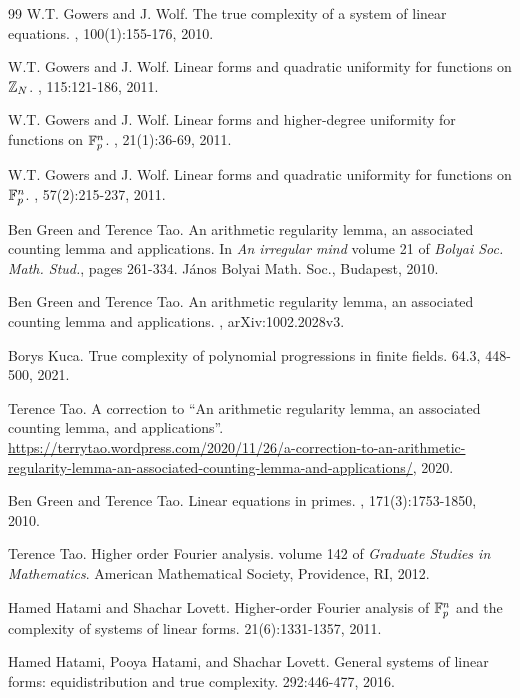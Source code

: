 \begin{thebibliography}{99}
W.T. Gowers and J. Wolf.
\newblock The true complexity of a system of linear equations.
, 100(1):155-176, 2010.
	
W.T. Gowers and J. Wolf.
\newblock Linear forms and quadratic uniformity for functions on {$\Bbb Z_N$}.
, 115:121-186, 2011.

W.T. Gowers and J. Wolf.
\newblock Linear forms and higher-degree uniformity for functions on {$\Bbb F^n_p$}.
, 21(1):36-69, 2011.	


W.T. Gowers and J. Wolf.
\newblock Linear forms and quadratic uniformity for functions on {$\Bbb F^n_p$}.
, 57(2):215-237, 2011.	

		
Ben Green and Terence Tao.
\newblock An arithmetic regularity lemma, an associated counting lemma and applications.
\newblock In {\em An irregular mind} volume 21 of {\em Bolyai Soc. Math. Stud.}, pages 261-334.
János Bolyai Math. Soc., Budapest, 2010.


Ben Green and Terence Tao.
\newblock An arithmetic regularity lemma, an associated counting lemma and applications.
, arXiv:1002.2028v3.

Borys Kuca.
\newblock True complexity of polynomial progressions in finite fields.
 64.3, 448-500, 2021.

Terence Tao.
\newblock A correction to ``An arithmetic regularity lemma, an associated counting lemma, and applications''.
\newblock \url{https://terrytao.wordpress.com/2020/11/26/a-correction-to-an-arithmetic-regularity-lemma-an-associated-counting-lemma-and-applications/}, 2020.

Ben Green and Terence Tao. 
\newblock Linear equations in primes.
, 171(3):1753-1850,
2010.

Terence Tao. 
\newblock Higher order {F}ourier analysis.
\newblock volume 142 of {\em Graduate Studies in Mathematics}.
American Mathematical Society, Providence, RI, 2012.

Hamed Hatami and Shachar Lovett. 
\newblock Higher-order {F}ourier analysis of {$\Bbb F^n_p$} and the
              complexity of systems of linear forms.
 21(6):1331-1357, 2011.              
   
Hamed Hatami, Pooya Hatami, and Shachar Lovett.
\newblock General systems of linear forms: equidistribution and true
              complexity.
 292:446-477, 2016.


\end{thebibliography}
